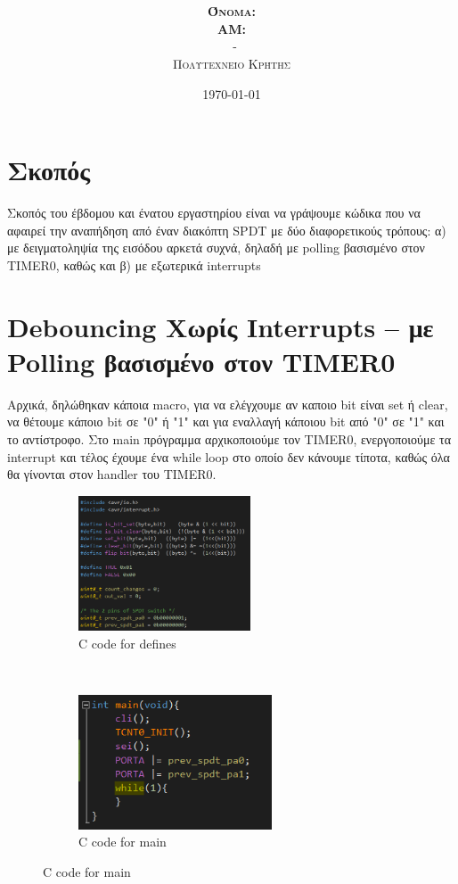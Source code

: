 \documentclass{article}
\title{\underline{\textbf{\assignmentNumber}}}
\author{\textsc{\textbf{Όνομα:}}  \studentName\\
		\textsc{\textbf{ΑΜ:}}  \studentNumber\\
		\course \ - \courseName\\ 
		\textsc{Πολυτεχνείο Κρήτης}
		}
\date{\today}
\begin{document}
	\maketitle

\section*{Σκοπός}
	Σκοπός του έβδομου και ένατου εργαστηρίου είναι να γράψουμε κώδικα που να αφαιρεί την αναπήδηση από έναν διακόπτη SPDT με δύο διαφορετικούς τρόπους: α) με δειγματοληψία της εισόδου αρκετά συχνά, δηλαδή με polling βασισμένο στον TIMER0, καθώς και β) με εξωτερικά interrupts

\section*{Debouncing Χωρίς Interrupts – με Polling βασισμένο στον TIMER0}
	Aρχικά, δηλώθηκαν κάποια macro, για να ελέγχουμε αν καποιο bit είναι set ή clear, να θέτουμε κάποιο bit σε "0" ή "1" και για εναλλαγή κάποιου bit από "0" σε "1" και το αντίστροφο. Στο main πρόγραμμα αρχικοποιούμε τον TIMER0, ενεργοποιούμε τα interrupt και τέλος έχουμε ένα while loop στο οποίο δεν κάνουμε τίποτα, καθώς όλα θα γίνονται στον handler του TIMER0.\\
	
	\begin{figure}[h!]
		\centering
		\begin{subfigure}[t]{0.5\textwidth}
			\centering
			\includegraphics[height=4cm, width=\linewidth]{./results/lab9_defines_a.png}
			\caption{C code for defines}
		\end{subfigure}%
		~
		\begin{subfigure}[t]{0.5\textwidth}
			\centering
			\includegraphics[height=4cm, width=\linewidth]{./results/lab9_main_a.png}
			\caption{C code for main}
		\end{subfigure}
	\end{figure}
	
\end{document}
